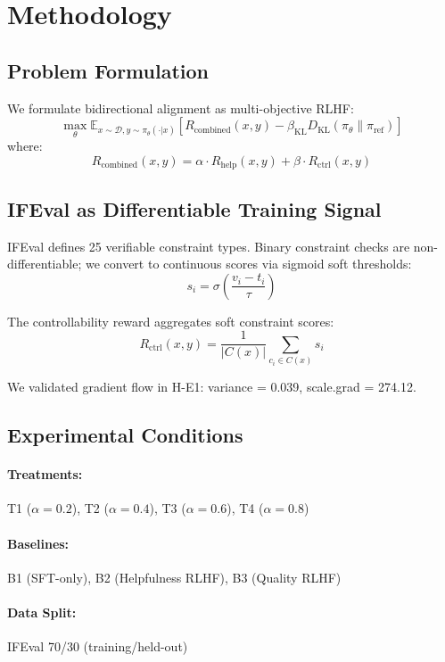 \section{Methodology}
\label{sec:methodology}

\subsection{Problem Formulation}

We formulate bidirectional alignment as multi-objective RLHF:
\begin{equation}
\max_\theta \mathbb{E}_{x \sim \mathcal{D}, y \sim \pi_\theta(\cdot|x)} \left[ R_{\text{combined}}(x, y) - \beta_{\text{KL}} D_{\text{KL}}(\pi_\theta \| \pi_{\text{ref}}) \right]
\end{equation}
where:
\begin{equation}
R_{\text{combined}}(x, y) = \alpha \cdot R_{\text{help}}(x, y) + \beta \cdot R_{\text{ctrl}}(x, y)
\end{equation}

\subsection{IFEval as Differentiable Training Signal}

IFEval defines 25 verifiable constraint types. Binary constraint checks are non-differentiable; we convert to continuous scores via sigmoid soft thresholds:
\begin{equation}
s_i = \sigma\left(\frac{v_i - t_i}{\tau}\right)
\end{equation}

The controllability reward aggregates soft constraint scores:
\begin{equation}
R_{\text{ctrl}}(x, y) = \frac{1}{|C(x)|} \sum_{c_i \in C(x)} s_i
\end{equation}

We validated gradient flow in H-E1: variance = 0.039, scale.grad = 274.12.

\subsection{Experimental Conditions}

\paragraph{Treatments:} T1 ($\alpha=0.2$), T2 ($\alpha=0.4$), T3 ($\alpha=0.6$), T4 ($\alpha=0.8$)

\paragraph{Baselines:} B1 (SFT-only), B2 (Helpfulness RLHF), B3 (Quality RLHF)

\paragraph{Data Split:} IFEval 70/30 (training/held-out)
